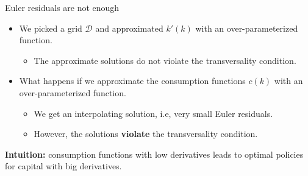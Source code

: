 \documentclass[aspectratio=169,10pt]{beamer}
\newcommand{\emphcolor}[1]{\textbf{\textcolor{emphcolorval}{#1}}}
\begin{document}
\begin{frame}{Euler residuals are not enough}
	\begin{itemize}
		\item We picked a grid $\mathcal{D}$ and approximated $k'(k)$ with an over-parameterized function.			\smallskip
		\begin{itemize}
			\item The approximate solutions do not violate the transversality condition. 
		\end{itemize} 
		\smallskip
		\item What happens if we approximate the consumption functions $c(k)$ with an over-parameterized function.			\smallskip
		\begin{itemize}
			\item We get an interpolating solution, i.e, very small Euler residuals.			\smallskip
			\item However, the solutions \emphcolor{violate} the transversality condition. 			\smallskip
		\end{itemize}
	\end{itemize}
	
	\emphcolor{Intuition:}  consumption functions with low derivatives leads to optimal policies for capital with big derivatives.
\end{frame}
\end{document}
